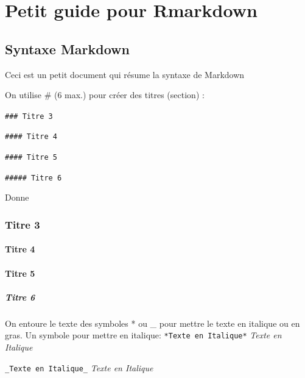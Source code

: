 \documentclass[12pt,]{book}
\let\oldparagraph\paragraph
\renewcommand{\paragraph}[1]{\oldparagraph{#1}\mbox{}}
\begin{document}
\hypertarget{appendix-appendice}{%
\appendix {}}


\hypertarget{petit-guide-pour-rmarkdown}{%
\chapter{Petit guide pour Rmarkdown}\label{petit-guide-pour-rmarkdown}}

\hypertarget{syntaxe-markdown}{%
\section{Syntaxe Markdown}\label{syntaxe-markdown}}

Ceci est un petit document qui résume la syntaxe de Markdown

On utilise \# (6 max.) pour créer des titres (section) :

\texttt{\#\#\#\ Titre\ 3}

\texttt{\#\#\#\#\ Titre\ 4}

\texttt{\#\#\#\#\ Titre\ 5}

\texttt{\#\#\#\#\#\ Titre\ 6}

Donne

\hypertarget{titre-3}{%
\subsection{Titre 3}\label{titre-3}}

\hypertarget{titre-4}{%
\subsubsection{Titre 4}\label{titre-4}}

\hypertarget{titre-5}{%
\subsubsection{Titre 5}\label{titre-5}}

\hypertarget{titre-6}{%
\paragraph{Titre 6}\label{titre-6}}

On entoure le texte des symboles * ou \_ pour mettre le texte en italique ou en gras.
Un symbole pour mettre en italique:
\texttt{*Texte\ en\ Italique*}
\emph{Texte en Italique}

\texttt{\_Texte\ en\ Italique\_}
\emph{Texte en Italique}
\end{document}
